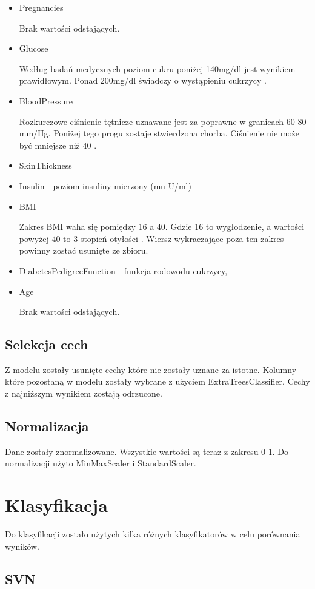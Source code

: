 \documentclass[12pt]{article}
\begin{document}
\begin{itemize}
\item Pregnancies

	Brak wartości odstających.
\item Glucose 

	Według badań medycznych poziom cukru poniżej 140mg/dl jest wynikiem prawidłowym. Ponad 200mg/dl świadczy o wystąpieniu cukrzycy \cite{sugarLevel}.
\item BloodPressure 

	Rozkurczowe ciśnienie tętnicze uznawane jest za poprawne w granicach 60-80 mm/Hg. Poniżej tego progu zostaje stwierdzona chorba. Ciśnienie nie może być mniejsze niż 40 \cite{pressure}.
\item SkinThickness


\item Insulin - poziom insuliny mierzony (mu U/ml)
\item BMI 

	Zakres BMI waha się pomiędzy 16 a 40. Gdzie 16 to wygłodzenie, a wartości powyżej 40 to 3 stopień otyłości \cite{bmi}. Wiersz wykraczające poza ten zakres powinny zostać usunięte ze zbioru.
	
\item DiabetesPedigreeFunction - funkcja rodowodu cukrzycy,
\item Age
	
	Brak wartości odstających.

\end{itemize}
\subsection{Selekcja cech}
	Z modelu zostały usunięte cechy które nie zostały uznane za istotne. Kolumny które pozostaną w modelu zostały wybrane z użyciem ExtraTreesClassifier. Cechy z najniższym wynikiem zostają odrzucone.  
\subsection{Normalizacja}
	Dane zostały znormalizowane. Wszystkie wartości są teraz z zakresu 0-1. Do normalizacji użyto MinMaxScaler i StandardScaler.
\section{Klasyfikacja}
	Do klasyfikacji zostało użytych kilka różnych klasyfikatorów w celu porównania wyników.

\subsection{SVN}
\end{document}
